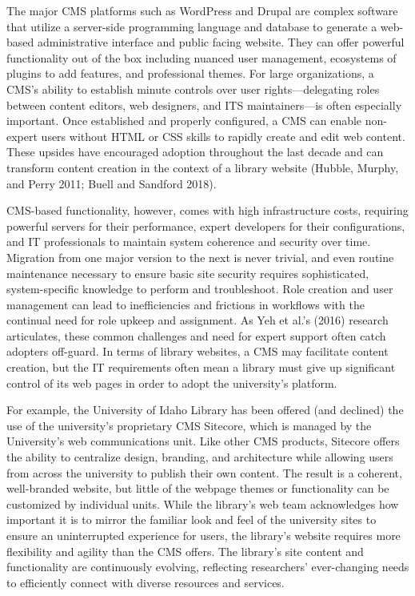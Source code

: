 \documentclass{book}
\begin{document}
The major CMS platforms such as WordPress and Drupal are complex software that
utilize a server-side programming language and database to generate a
web-based administrative interface and public facing website. They can offer
powerful functionality out of the box including nuanced user management,
ecosystems of plugins to add features, and professional themes. For large
organizations, a CMS's ability to establish minute controls over user
rights---delegating roles between content editors, web designers, and ITS
maintainers---is often especially important. Once established and properly
configured, a CMS can enable non-expert users without HTML or CSS skills to
rapidly create and edit web content. These upsides have encouraged adoption
throughout the last decade and can transform content creation in the context
of a library website (Hubble, Murphy, and Perry 2011; Buell and Sandford
2018).

CMS-based functionality, however, comes with high infrastructure costs,
requiring powerful servers for their performance, expert developers for their
configurations, and IT professionals to maintain system coherence and security
over time. Migration from one major version to the next is never trivial, and
even routine maintenance necessary to ensure basic site security requires
sophisticated, system-specific knowledge to perform and troubleshoot. Role
creation and user management can lead to inefficiencies and frictions in
workflows with the continual need for role upkeep and assignment. As Yeh et
al.'s (2016) research articulates, these common challenges and need for expert
support often catch adopters off-guard. In terms of library websites, a CMS
may facilitate content creation, but the IT requirements often mean a library
must give up significant control of its web pages in order to adopt the
university's platform.

For example, the University of Idaho Library has been offered (and declined)
the use of the university's proprietary CMS Sitecore, which is managed by the
University's web communications unit. Like other CMS products, Sitecore offers
the ability to centralize design, branding, and architecture while allowing
users from across the university to publish their own content. The result is a
coherent, well-branded website, but little of the webpage themes or
functionality can be customized by individual units. While the library's web
team acknowledges how important it is to mirror the familiar look and feel of
the university sites to ensure an uninterrupted experience for users, the
library's website requires more flexibility and agility than the CMS offers.
The library's site content and functionality are continuously evolving,
reflecting researchers' ever-changing needs to efficiently connect with
diverse resources and services.
\end{document}
